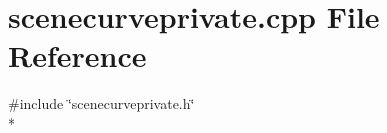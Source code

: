 \section{scenecurveprivate.\+cpp File Reference}
\label{curve_2scenecurveprivate_8cpp}
{\ttfamily \#include \char`\"{}scenecurveprivate.\+h\char`\"{}}\\*
